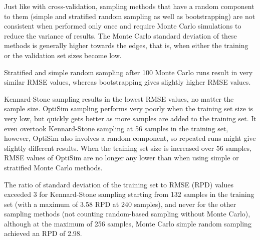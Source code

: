 \documentclass{isprs}
\begin{document}
Just like with cross-validation, sampling methods that have a random component to them (simple and stratified random sampling as well as bootstrapping) are not consistent when performed only once and require Monte Carlo simulations to reduce the variance of results. The Monte Carlo standard deviation of these methods is generally higher towards the edges, that is, when either the training or the validation set sizes become low.

Stratified and simple random sampling after 100 Monte Carlo runs result in very similar RMSE values, whereas bootstrapping gives slightly higher RMSE values.

Kennard-Stone sampling results in the lowest RMSE values, no matter the sample size. OptiSim sampling performs very poorly when the training set size is very low, but quickly gets better as more samples are added to the training set. It even overtook Kennard-Stone sampling at 56 samples in the training set, however, OptiSim also involves a random component, so repeated runs might give slightly different results. When the training set size is increased over 56 samples, RMSE values of OptiSim are no longer any lower than when using simple or stratified Monte Carlo methods.

The ratio of standard deviation of the training set to RMSE (RPD) values exceeded 3 for Kennard-Stone sampling starting from 132 samples in the training set (with a maximum of 3.58 RPD at 240 samples), and never for the other sampling methods (not counting random-based sampling without Monte Carlo), although at the maximum of 256 samples, Monte Carlo simple random sampling achieved an RPD of 2.98.
\end{document}

